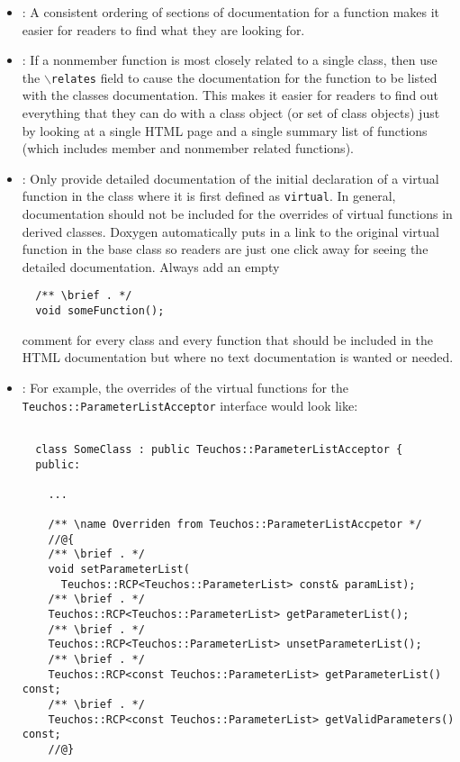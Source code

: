 \begin{itemize}
{}\item\DOXOrderOfDocFieds: A consistent ordering of sections of documentation
for a function makes it easier for readers to find what they are looking for.


{}\item\DOXUseRelatesForNonmemberFunctions: If a nonmember function is most
closely related to a single class, then use the {}\texttt{$\backslash$relates}
field to cause the documentation for the function to be listed with the
classes documentation.  This makes it easier for readers to find out
everything that they can do with a class object (or set of class objects) just
by looking at a single HTML page and a single summary list of functions (which
includes member and nonmember related functions).


{}\item\DOXDocumentInitialVirtualOnly: Only provide detailed documentation of
the initial declaration of a virtual function in the class where it is first
defined as {}\texttt{virtual}.  In general, documentation should not be
included for the overrides of virtual functions in derived classes.  Doxygen
automatically puts in a link to the original virtual function in the base
class so readers are just one click away for seeing the detailed
documentation.  Always add an empty
%
{\small\begin{verbatim}
  /** \brief . */
  void someFunction();
\end{verbatim}}
%
comment for every class and every function that should be included in the HTML
documentation but where no text documentation is wanted or needed.


{}\item\DOXAggregateOverrides: For example, the overrides of the virtual
functions for the {}\texttt{Teuchos\-::Parameter\-List\-Acceptor} interface
would look like:

{\small\begin{verbatim}

  class SomeClass : public Teuchos::ParameterListAcceptor {
  public:

    ...

    /** \name Overriden from Teuchos::ParameterListAccpetor */
    //@{
    /** \brief . */
    void setParameterList(
      Teuchos::RCP<Teuchos::ParameterList> const& paramList);
    /** \brief . */
    Teuchos::RCP<Teuchos::ParameterList> getParameterList();
    /** \brief . */
    Teuchos::RCP<Teuchos::ParameterList> unsetParameterList();
    /** \brief . */
    Teuchos::RCP<const Teuchos::ParameterList> getParameterList() const;
    /** \brief . */
    Teuchos::RCP<const Teuchos::ParameterList> getValidParameters() const;
    //@}


\end{verbatim}}
\end{itemize}
